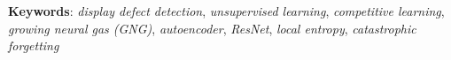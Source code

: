 \begin{small}
\vspace*{1cm}
\textbf{Keywords}: \textit{display defect detection}, \textit{unsupervised learning}, \textit{competitive learning}, \textit{growing neural gas (GNG)}, \textit{autoencoder}, \textit{ResNet}, \textit{local entropy}, \textit{catastrophic forgetting}

\end{small}